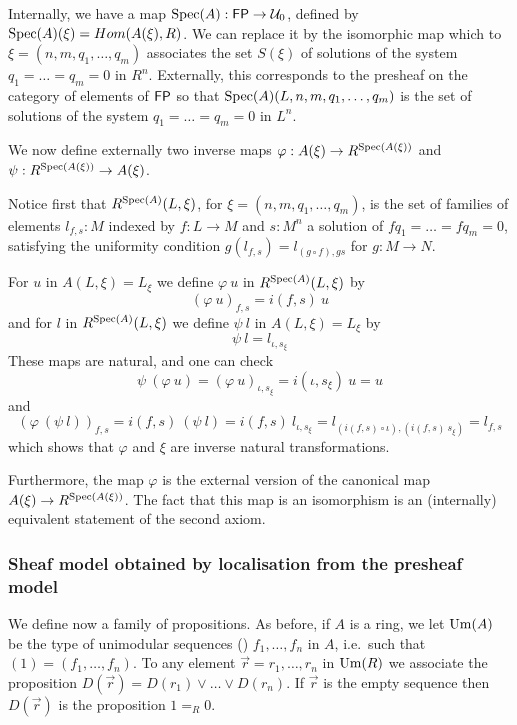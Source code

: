Internally, we have a map $\operatorname{Spec}(A):\mathsf{FP}\rightarrow \mathcal{U}_0$, defined by $\operatorname{Spec}(A)(\xi) = Hom(A(\xi),R)$.
We can replace it by the isomorphic map which to $\xi = (n,m,q_1,\dots,q_m)$ associates the set
$S(\xi)$ of solutions of the system $q_1=\dots=q_m= 0$ in $R^n$.
Externally, this corresponds to the presheaf on the category of elements of $\mathsf{FP}$ so that
$\operatorname{Spec}(A)(L,n,m,q_1,\dots,q_m)$ is the set of solutions of the system $q_1=\dots=q_m=0$ in $L^n$.

\medskip

We now define externally two inverse maps $\varphi:A(\xi)\rightarrow R^{\operatorname{Spec}(A(\xi))}$ and
$\psi:R^{\operatorname{Spec}(A(\xi))}\rightarrow A(\xi)$.

\medskip

Notice first that $R^{\operatorname{Spec}(A)}(L,\xi)$, for $\xi = (n,m,q_1,\dots,q_m)$,
is the set of families of elements $l_{f,s}:M$ indexed by $f:L\rightarrow M$
and $s:M^n$ a solution of $fq_1 = \dots = fq_m=0$, satisfying the uniformity condition
$g(l_{f,s}) = l_{(g\circ f),gs}$ for $g:M\rightarrow N$.

\medskip

For $u$ in $A(L,\xi) = L_{\xi}$ we define $\varphi~u$ in $R^{\operatorname{Spec}(A)}(L,\xi)$ by
$$
(\varphi~u)_{f,s} = i(f,s)~u
$$
and for $l$ in $R^{\operatorname{Spec}(A)}(L,\xi)$ we define $\psi~l$ in $A(L,\xi) = L_{\xi}$ by
$$
\psi~ l = l_{\iota,s_{\xi}}
$$
These maps are natural, and one can check
$$
\psi~(\varphi~u) = (\varphi~u)_{\iota,s_{\xi}} = i(\iota,s_{\xi})~u = u
$$
and
$$
(\varphi~(\psi~l))_{f,s} = i(f,s)~(\psi~l) = i(f,s)~l_{\iota,s_{\xi}} = l_{(i(f,s)\circ \iota),(i(f,s)~s_{\xi})} = l_{f,s}
$$
which shows that $\varphi$ and $\xi$ are inverse natural transformations.

Furthermore, the map $\varphi$ is the external version of the canonical map $A(\xi)\rightarrow R^{\operatorname{Spec}(A(\xi))}$.
The fact that this map is an isomorphism is an (internally) equivalent statement of the second axiom.



\subsubsection{Sheaf model obtained by localisation from the presheaf model}

We define now a family of propositions. As before, if $A$ is a ring, we let $\mathrm{Um}(A)$ be the type of unimodular sequences
()
$f_1,\dots,f_n$ in $A$, i.e.\ such that $(1) = (f_1,\dots,f_n)$. To any element $\vec{r} = r_1,\dots,r_n$
in $\mathrm{Um}(R)$ we associate
the proposition $D(\vec{r}) = D(r_1)\vee\dots\vee D(r_n)$. If $\vec{r}$ is the empty sequence then
$D(\vec{r})$ is the proposition $1 =_R 0$. %

